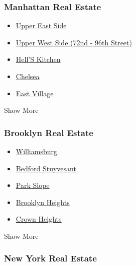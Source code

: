 \hypertarget{manhattan-real-estate}{%
\subsubsection{Manhattan Real Estate}\label{manhattan-real-estate}}

\begin{itemize}
\tightlist
\item
  \href{/real-estate/usa/ny/new-york/upper-east-side/homes-for-rent}{Upper
  East Side}
\item
  \href{/real-estate/usa/ny/new-york/upper-west-side-(72nd-96th-street)/homes-for-rent}{Upper
  West Side (72nd - 96th Street)}
\item
  \href{/real-estate/usa/ny/new-york/hell-s-kitchen/homes-for-rent}{Hell'S
  Kitchen}
\item
  \href{/real-estate/usa/ny/new-york/chelsea/homes-for-rent}{Chelsea}
\item
  \href{/real-estate/usa/ny/new-york/east-village/homes-for-rent}{East
  Village}
\end{itemize}

Show More

\hypertarget{brooklyn-real-estate}{%
\subsubsection{Brooklyn Real Estate}\label{brooklyn-real-estate}}

\begin{itemize}
\tightlist
\item
  \href{/real-estate/usa/ny/brooklyn/williamsburg/homes-for-rent}{Williamsburg}
\item
  \href{/real-estate/usa/ny/brooklyn/bedford-stuyvesant/homes-for-rent}{Bedford
  Stuyvesant}
\item
  \href{/real-estate/usa/ny/brooklyn/park-slope/homes-for-rent}{Park
  Slope}
\item
  \href{/real-estate/usa/ny/brooklyn/brooklyn-heights/homes-for-rent}{Brooklyn
  Heights}
\item
  \href{/real-estate/usa/ny/brooklyn/crown-heights/homes-for-rent}{Crown
  Heights}
\end{itemize}

Show More

\hypertarget{new-york-real-estate}{%
\subsubsection{New York Real Estate}\label{new-york-real-estate}}

